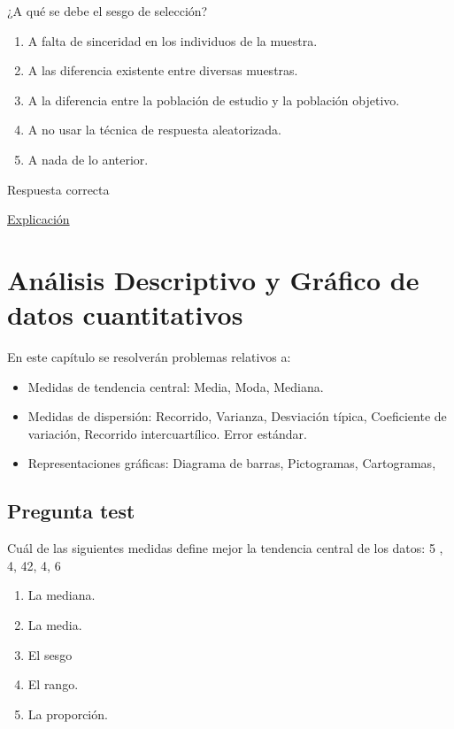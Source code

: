 \documentclass[
]{book}
\providecommand{\tightlist}{%
  \setlength{\itemsep}{0pt}\setlength{\parskip}{0pt}}
\begin{document}
¿A qué se debe el sesgo de selección?

\begin{enumerate}
\def\labelenumi{\alph{enumi})}
\tightlist
\item
  A falta de sinceridad en los individuos de la muestra.
\item
  A las diferencia existente entre diversas muestras.
\item
  A la diferencia entre la población de estudio y la población objetivo.
\item
  A no usar la técnica de respuesta aleatorizada.
\item
  A nada de lo anterior.
\end{enumerate}

Respuesta correcta

\href{https://es.wikipedia.org/wiki/Sesgo_de_selección}{Explicación}

\hypertarget{anuxe1lisis-descriptivo-y-gruxe1fico-de-datos-cuantitativos}{%
\chapter{Análisis Descriptivo y Gráfico de datos cuantitativos}\label{anuxe1lisis-descriptivo-y-gruxe1fico-de-datos-cuantitativos}}

En este capítulo se resolverán problemas relativos a:

\begin{itemize}
\tightlist
\item
  Medidas de tendencia central: Media, Moda, Mediana.
\item
  Medidas de dispersión: Recorrido, Varianza, Desviación típica, Coeficiente de variación, Recorrido intercuartílico. Error estándar.
\item
  Representaciones gráficas: Diagrama de barras, Pictogramas, Cartogramas,
\end{itemize}

\hypertarget{pregunta-test-50}{%
\section{Pregunta test}\label{pregunta-test-50}}

Cuál de las siguientes medidas define mejor la tendencia central de los datos: 5 , 4, 42, 4, 6

\begin{enumerate}
\def\labelenumi{\alph{enumi})}
\tightlist
\item
  La mediana.
\item
  La media.
\item
  El sesgo
\item
  El rango.
\item
  La proporción.
\end{enumerate}
\end{document}
